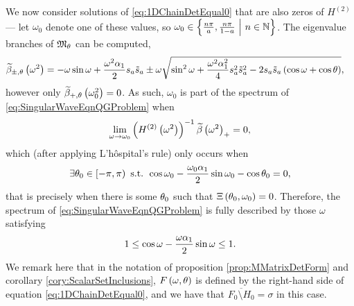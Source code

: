 We now consider solutions of \eqref{eq:1DChainDetEqual0} that are also zeros of $H^{(2)}$ --- let $\omega_0$ denote one of these values, so $\omega_0\in\left\{ \frac{n\pi}{a}, \frac{n\pi}{1-a} \ \middle\vert \  n\in\mathbb{N}  \right\}$.
The eigenvalue branches of $\mathfrak{M}_{\theta}$ can be computed,
\begin{align*}
	\widetilde{\beta}_{\pm, \theta}\left( \omega^2 \right) &= -\omega\sin\omega + \frac{\omega^2\alpha_1}{2}s_a \tilde{s}_a \pm \omega\sqrt{ \sin^2\omega + \frac{\omega^2\alpha_1^2}{4}s_a^2 \tilde{s}_a^2 - 2s_a \tilde{s}_a\left( \cos\omega+\cos\theta \right) },
\end{align*}
however only $\widetilde{\beta}_{+, \theta}\left( \omega_0^2 \right)=0$.
As such, $\omega_0$ is part of the spectrum of \eqref{eq:SingularWaveEqnQGProblem} when
\begin{align*}
	\lim_{\omega\rightarrow\omega_0}\left(  H^{(2)}\left( \omega^2 \right)  \right)^{-1}\widetilde{\beta}\left( \omega^2 \right)_{+} = 0,
\end{align*}
which (after applying L'h\^{o}spital's rule) only occurs when
\begin{align*}
	\exists\theta_0\in\left[-\pi,\pi\right) \text{ s.t. } \cos\omega_0 - \frac{\omega_0\alpha_1}{2}\sin\omega_0 - \cos\theta_0 = 0,
\end{align*}
that is precisely when there is some $\theta_0$ such that $\Xi\left( \theta_0,\omega_0 \right)=0$.
Therefore, the spectrum of \eqref{eq:SingularWaveEqnQGProblem} is fully described by those $\omega$ satisfying
\begin{align*}
	\-1 \leq \cos\omega - \frac{\omega\alpha_1}{2}\sin\omega \leq 1.
\end{align*}
We remark here that in the notation of proposition \ref{prop:MMatrixDetForm} and corollary \ref{cory:ScalarSetInclusions}, $F\left( \omega, \theta \right)$ is defined by the right-hand side of equation \eqref{eq:1DChainDetEqual0}, and we have that $\overline{F_0\setminus H_0}=\sigma$ in this case.


